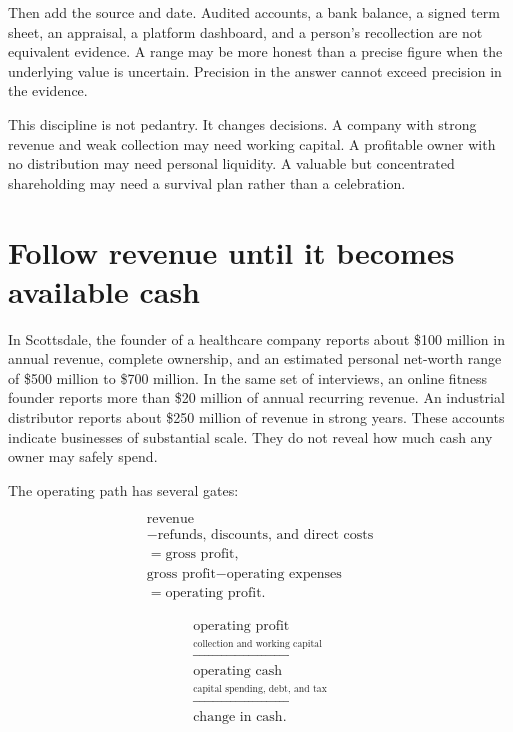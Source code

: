Then add the source and date. Audited accounts, a bank balance, a signed term
sheet, an appraisal, a platform dashboard, and a person's recollection are not
equivalent evidence. A range may be more honest than a precise figure when the
underlying value is uncertain. Precision in the answer cannot exceed precision
in the evidence.

This discipline is not pedantry. It changes decisions. A company with strong
revenue and weak collection may need working capital. A profitable owner with
no distribution may need personal liquidity. A valuable but concentrated
shareholding may need a survival plan rather than a celebration.

\section{Follow revenue until it becomes available cash}

In Scottsdale, the founder of a healthcare company reports about \$100 million
in annual revenue, complete ownership, and an estimated personal net-worth
range of \$500 million to \$700 million. In the same set of interviews, an
online fitness founder reports more than \$20 million of annual recurring
revenue. An industrial distributor reports about \$250 million of revenue in
strong years. These accounts indicate businesses of substantial scale. They do
not reveal how much cash any owner may safely spend.

The operating path has several gates:

\begin{equation}
\begin{gathered}
\text{revenue}\\
-\text{refunds, discounts, and direct costs}\\
=\text{gross profit},\\[0.5ex]
\text{gross profit}-\text{operating expenses}\\
=\text{operating profit}.
\end{gathered}
\end{equation}

\begin{equation}
\begin{gathered}
\text{operating profit}\\[-0.35ex]
\xrightarrow{\text{collection and working capital}}\\[-0.35ex]
\text{operating cash}\\[-0.35ex]
\xrightarrow{\text{capital spending, debt, and tax}}\\[-0.35ex]
\text{change in cash}.
\end{gathered}
\end{equation}

